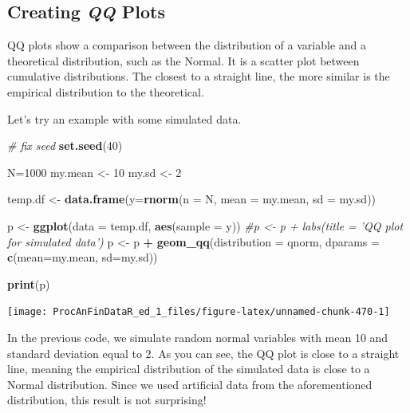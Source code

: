 \documentclass[11pt,]{book}
\newenvironment{Shaded}{\begin{snugshade}}{\end{snugshade}}
\newcommand{\KeywordTok}[1]{\textcolor[rgb]{0.27,0.27,0.27}{\textbf{#1}}}
\newcommand{\DataTypeTok}[1]{\textcolor[rgb]{0.27,0.27,0.27}{#1}}
\newcommand{\DecValTok}[1]{\textcolor[rgb]{0.06,0.06,0.06}{#1}}
\newcommand{\StringTok}[1]{\textcolor[rgb]{0.5,0.5,0.5}{#1}}
\newcommand{\CommentTok}[1]{\textcolor[rgb]{0.56,0.35,0.01}{\textit{#1}}}
\newcommand{\OperatorTok}[1]{\textcolor[rgb]{0.81,0.36,0.00}{\textbf{#1}}}
\newcommand{\NormalTok}[1]{#1}
\begin{document}
\subsection{\texorpdfstring{Creating \emph{QQ}
Plots}{Creating QQ Plots}}\label{creating-qq-plots}

QQ plots show a comparison between the distribution of a variable and a
theoretical distribution, such as the Normal. It is a scatter plot
between cumulative distributions. The closest to a straight line, the
more similar is the empirical distribution to the theoretical.

Let's try an example with some simulated data.

\begin{Shaded}
\begin{Highlighting}[]
\CommentTok{# fix seed}
\KeywordTok{set.seed}\NormalTok{(}\DecValTok{40}\NormalTok{)}

\NormalTok{N=}\DecValTok{1000}
\NormalTok{my.mean <-}\StringTok{ }\DecValTok{10}
\NormalTok{my.sd <-}\StringTok{ }\DecValTok{2}

\NormalTok{temp.df <-}\StringTok{ }\KeywordTok{data.frame}\NormalTok{(}\DataTypeTok{y=}\KeywordTok{rnorm}\NormalTok{(}\DataTypeTok{n =}\NormalTok{ N, }\DataTypeTok{mean =}\NormalTok{ my.mean, }\DataTypeTok{sd =}\NormalTok{ my.sd))}

\NormalTok{p <-}\StringTok{ }\KeywordTok{ggplot}\NormalTok{(}\DataTypeTok{data =}\NormalTok{ temp.df, }\KeywordTok{aes}\NormalTok{(}\DataTypeTok{sample =}\NormalTok{ y)) }
\CommentTok{#p <- p + labs(title = 'QQ plot for simulated data')}
\NormalTok{p <-}\StringTok{ }\NormalTok{p }\OperatorTok{+}\StringTok{ }\KeywordTok{geom_qq}\NormalTok{(}\DataTypeTok{distribution =}\NormalTok{ qnorm, }
                 \DataTypeTok{dparams =} \KeywordTok{c}\NormalTok{(}\DataTypeTok{mean=}\NormalTok{my.mean, }\DataTypeTok{sd=}\NormalTok{my.sd))}
  
\KeywordTok{print}\NormalTok{(p)}
\end{Highlighting}
\end{Shaded}

\begin{center}\texttt{[image: ProcAnFinDataR\_ed\_1\_files/figure-latex/unnamed-chunk-470-1]} \end{center}

In the previous code, we simulate random normal variables with mean 10
and standard deviation equal to 2. As you can see, the QQ plot is close
to a straight line, meaning the empirical distribution of the simulated
data is close to a Normal distribution. Since we used artificial data
from the aforementioned distribution, this result is not surprising!
\end{document}

